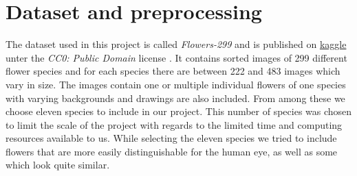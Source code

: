 \section{Dataset and preprocessing}
\label{sec:dataset}
The dataset used in this project is called \textit{Flowers-299} and is published on \href{https://www.kaggle.com/bogdancretu/flower299}{kaggle} unter the \textit{CC0: Public Domain} license \cite{data}.
It contains sorted images of 299 different flower species and for each species there are between 222 and 483 images which vary in size.
The images contain one or multiple individual flowers of one species with varying backgrounds and drawings are also included.
From among these we choose eleven species to include in our project.
This number of species was chosen to limit the scale of the project with regards to the limited time and computing resources available to us.
While selecting the eleven species we tried to include flowers that are more easily distinguishable for the human eye, as well as some which look quite similar.

